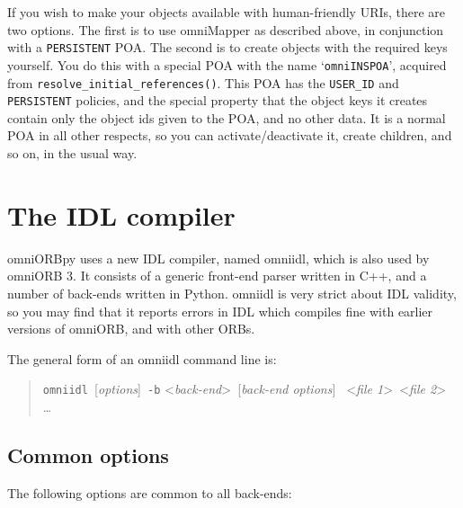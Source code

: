 \documentclass[11pt,twoside,a4paper]{book}
\newcommand{\code}[1]{\texttt{#1}}
\newcommand{\op}[1]{\texttt{#1()}}
\newcommand{\cmdline}[1]{\texttt{#1}}
\begin{document}
If you wish to make your objects available with human-friendly URIs,
there are two options. The first is to use omniMapper as described
above, in conjunction with a \code{PERSISTENT} POA. The second is to
create objects with the required keys yourself. You do this with a
special POA with the name `\texttt{omniINSPOA}', acquired from
\op{resolve\_initial\_references}. This POA has the \code{USER\_ID}
and \code{PERSISTENT} policies, and the special property that the
object keys it creates contain only the object ids given to the POA,
and no other data. It is a normal POA in all other respects, so you
can activate/deactivate it, create children, and so on, in the usual
way.




\chapter{The IDL compiler}
\label{chap:omniidl}

omniORBpy uses a new IDL compiler, named omniidl, which is also used
by omniORB 3. It consists of a generic front-end parser written in
C++, and a number of back-ends written in Python. omniidl is very
strict about IDL validity, so you may find that it reports errors in
IDL which compiles fine with earlier versions of omniORB, and with
other ORBs.

The general form of an omniidl command line is:

\begin{quote} %
\cmdline{omniidl }[\textit{options}]\cmdline{ -b}%
<\textit{back-end}>\cmdline{ }[\textit{back-end options}]%
\cmdline{ }<\textit{file 1}>\cmdline{ }<\textit{file 2}>%
\cmdline{ }\dots
\end{quote}

\section{Common options}

The following options are common to all back-ends:
\end{document}
